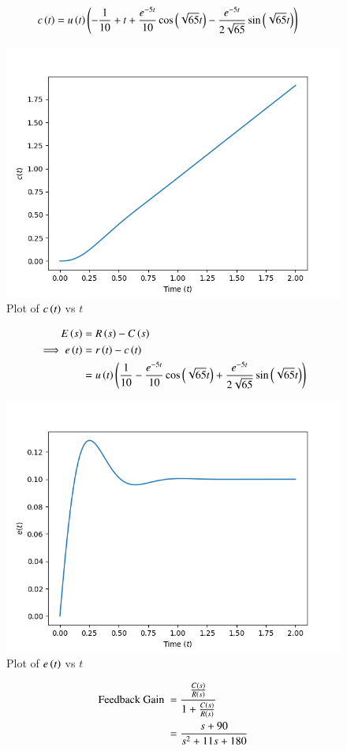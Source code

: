 \documentclass[journal,12pt,twocolumn]{IEEEtran}
\theoremstyle{remark}
\begin{document}
\begin{align}
c\left(t\right) &= u\left(t\right)\left(-\frac{1}{10} + t + \frac{e^{-5t}}{10} \cos{\ensuremath{\left(\sqrt{65}t\right)}} - \frac{e^{-5t}}{2\sqrt{65}}\sin{\ensuremath{\left(\sqrt{65}t\right)}}\right)
\end{align}
\begin{figure}[h!]
\centering
\includegraphics[width=\columnwidth]{2021/BM/46/figs/c_t.png}
\caption{Plot of $c\left(t\right)$ vs $t$}
\label{fig:2021bm46-3}
\end{figure}
\begin{align}
E\left(s\right) &= R\left(s\right) - C\left(s\right) \\
\implies e\left(t\right) &= r\left(t\right) - c\left(t\right) \\
&= u\left(t\right)\left(\frac{1}{10} - \frac{e^{-5t}}{10} \cos{\ensuremath{\left(\sqrt{65}t\right)}} + \frac{e^{-5t}}{2\sqrt{65}}\sin{\ensuremath{\left(\sqrt{65}t\right)}}\right)
\end{align}
\begin{figure}[h!]
\centering
\includegraphics[width=\columnwidth]{2021/BM/46/figs/e_t.png}
\caption{Plot of $e\left(t\right)$ vs $t$}
\label{fig:2021bm46-4}
\end{figure}
\begin{align}
\text{Feedback Gain } &= \frac{\frac{C\left(s\right)}{R\left(s\right)}}{1 + \frac{C\left(s\right)}{R\left(s\right)}} \\
&= \frac{s + 90}{s^2 + 11s + 180}
\end{align}
\end{document}
